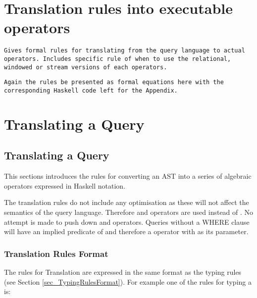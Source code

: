 \section{Translation rules into executable operators}
\label{sec_translating}
\texttt{Gives formal rules for translating from the query language to actual operators.
Includes specific rule of when to use the  relational, windowed or stream versions of each operators.}

\texttt{Again the rules be presented as formal equations here with the corresponding Haskell code left for the Appendix.}

\section{Translating a \SNEEql Query}
\subsection{Translating a Query}
\label{sec_wholeQueryTranslation}

This sections introduces the rules for converting an AST into a series of algebraic operators expressed in Haskell notation.

The translation rules do not include any optimisation as these will not affect the semantics of the query language.
Therefore  and  operators are used instead of . 
No attempt is made to push down  and  operators.
Queries without a WHERE clause will have an implied predicate of  and therefore a  operator with  as its parameter.
 
\subsubsection{Translation Rules Format}
\setcounter{equation2}{\value{equation}}
\setcounter{equation}{-1}

The rules for Translation are expressed in the same format as the typing rules (see Section \ref{sec_TypingRulesFormat}).
For example one of the rules for typing a  is:


